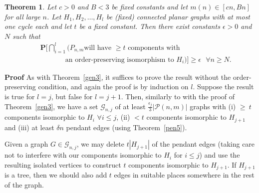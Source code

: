 \documentclass{article}
\newtheorem{Theorem}{Theorem}
\newtheorem{Proof of Theorem}{Proof of Theorem}
\begin{document}
\begin{Theorem} \label{gen4}
Let $c>0$ and $B<3$ be fixed constants and let $m(n) \in [cn,Bn]$ for all large $n$.
Let $H_{1},H_{2}, \ldots, H_{l}$ 
be (fixed) connected planar graphs with at most one cycle each and let $t$ be a fixed constant.
Then there exist constants $\epsilon > 0$ and $N$ such that
\begin{eqnarray*}
& & \mathbf{P} 
\Big[ \bigcap_{i=1}^{l} 
(
\textrm{$P_{n,m}$
will have $\geq t$ components with} \\
& & \phantom{wwwww}\textrm{an order-preserving isomorphism to $H_{i}$} ) ] 
\geq \epsilon \textrm{ } \forall n \geq N.
\end{eqnarray*} 
\end{Theorem}
\textbf{Proof}
As with Theorem~\ref{gen3},
it suffices to prove the result without the order-preserving condition,
and again the proof is by induction on $l$.
Suppose the result is true for $l=j$,
but false for $l=j+1$.
Then, similarly to with the proof of Theorem~\ref{gen3}, 
we have a set $\mathcal{G}_{n,j}$ of at least $\frac{\epsilon_{j}}{3} |\mathcal{P}(n,m)|$ graphs with
(i) $\geq~t$ components isomorphic to $H_{i}$ $\forall i \leq j$,
(ii) $<t$ components isomorphic to $H_{j+1}$ 
and (iii) at least $\delta n$ pendant edges (using Theorem~\ref{pen5}).

Given a graph $G \in \mathcal{G}_{n,j}$,
we may delete $t|H_{j+1}|$ of the pendant edges
(taking care not to interfere with our components isomorphic to $H_{i}$ for $i \leq j$)
and use the resulting isolated vertices to construct $t$ components isomorphic to $H_{j+1}$.
If $H_{j+1}$ is a tree, then we should also add $t$ edges in suitable places somewhere in the rest of the graph.
\end{document}
